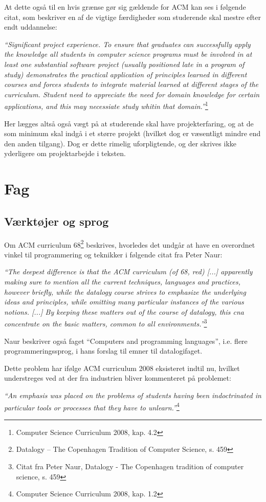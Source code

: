 \documentclass[10pt,a4paper]{article}
\newcommand{\citat}[2]{\begin{justify}\textit{``#1''}\hspace{0.1cm}\footnote{#2}\end{justify}}
\begin{document}
At dette også til en hvis grænse gør sig gældende for ACM kan ses i følgende
citat, som beskriver en af de vigtige færdigheder som studerende skal mestre
efter endt uddannelse: \citat{\emph{Significant project experience}. To ensure
    that graduates can successfully apply the knowledge all students in computer
    science programs must be involved in at least one substantial software
    project (usually positioned late in a program of study) demonstrates the
    practical application of principles learned in different courses and forces
    students to integrate material learned at different stages of the
    curriculum. Student need to appreciate the need for domain knowledge for
    certain applications, and this may necessiate study whitin that
    domain.}{Computer Science Curriculum 2008, kap. 4.2}

Her lægges altså også vægt på at studerende skal have projekterfaring, og at de
som minimum skal indgå i et større projekt (hvilket dog er væsentligt mindre end
den anden tilgang). Dog er dette rimelig uforpligtende, og der skrives ikke
yderligere om projektarbejde i teksten.

\section{Fag}
\subsection{Værktøjer og sprog}
Om ACM curriculum 68\footnote{Datalogy -- The Copenhagen Tradition of Computer
    Science, s. 459} beskrives, hvorledes det undgår at have en overordnet
vinkel til programmering og teknikker i følgende citat fra Peter Naur:
\citat{The deepest difference is that the ACM curriculum (of 68, red) [...]
    apparently making sure to mention all the current techniques, languages and
    practices, however briefly, while the datalogy course strives to emphasize
    the underlying ideas and principles, while omitting many particular
    instances of the various notions. [...] By keeping these matters out of the
    course of datalogy, this cna concentrate on the basic matters, common to all
    environments.}{Citat fra Peter Naur, Datalogy - The Copenhagen tradition of
    computer science, s. 459}

Naur beskriver også faget ``Computers and programming languages'', i.e. flere
programmeringssprog, i hans forslag til emner til datalogifaget. 

Dette problem har ifølge ACM curriculum 2008 eksisteret indtil nu, hvilket
understreges ved at der fra industrien bliver kommenteret på problemet:
\citat{An emphasis was placed on the problems of students having been
    indoctrinated in particular tools or processes that they have to
    unlearn.}{Computer Science Curriculum 2008, kap. 1.2}
\end{document}
